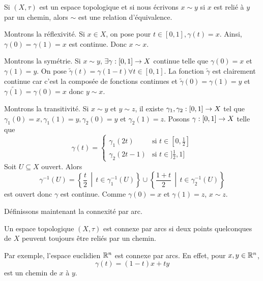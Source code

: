 \documentclass[french]{article}
\begin{document}
\begin{lemme}
  Si $(X, \tau)$ est un espace topologique et si nous écrivons $x \sim y$ si $x$ est relié à $y$ par un chemin, alors $\sim$ est une relation d'équivalence.

  \tcblower
  \begin{preuve}
    Montrons la réflexivité. Si $x \in X$, on pose pour $t \in [0, 1], \gamma(t) = x$. Ainsi, $\gamma(0) = \gamma(1) = x$ est continue. Donc $x \sim x$.
    \par Montrons la symétrie. Si  $x \sim y$, $\exists \gamma: [0, 1] \rightarrow X$ continue telle que $\gamma(0) = x$ et $\gamma(1) = y$. On pose  $\tilde{\gamma}(t) = \gamma(1-t) \forall t \in [0, 1]$. La fonction $\tilde{\gamma}$ est clairement continue car c'est la composée de fonctions continues et $\tilde{\gamma}(0) = \gamma(1) = y$ et $\tilde{\gamma(1)} = \gamma(0) = x$ donc $y \sim x$.
        \par Montrons la transitivité. Si $x \sim y$ et $y \sim z$, il existe $\gamma_1, \gamma_2: [0, 1] \rightarrow X$ tel que $\gamma_1(0)=x, \gamma_1(1) = y, \gamma_2(0) = y$ et $\gamma_2(1) = z$. Posons $\gamma: [0, 1] \rightarrow X$ telle que
     $$\gamma(t) = \begin{cases}
       \gamma_1(2t) & \text{si } t \in [0, \frac{1}{2}] \\
       \gamma_2(2t - 1) & \text{si } t \in ]\frac{1}{2}, 1]
     \end{cases}$$
     Soit $U \subseteq X$ ouvert. Alors
     $$\gamma^{-1}(U) = \left\{ \frac{t}{2} \,\middle\vert\, t \in \gamma_1^{-1}(U) \right\} \cup \left\{ \frac{1+t}{2} \,\middle\vert\, t \in \gamma_2^{-1}(U) \right\}$$ 
     est ouvert donc $\gamma$ est continue. Comme $\gamma(0) = x$ et $\gamma(1)=z$, $x \sim z$.
  \end{preuve}
\end{lemme}
Définissons maintenant la connexité par arc.

\begin{definition}
  Un espace topologique $(X,\tau)$ est connexe par arcs si deux points quelconques de $X$ peuvent toujours être reliés par un chemin.
\end{definition}
Par exemple, l'espace euclidien $\mathbb{R}^n$ est connexe par arcs. En effet, pour $x, y \in \mathbb{R}^n$,
$$\gamma(t) = (1-t)x + ty$$
est un chemin de  $x$ à $y$.
\end{document}

